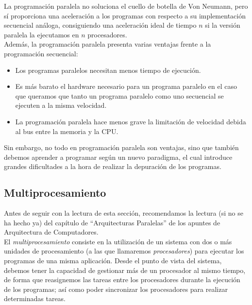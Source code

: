 La programación paralela no soluciona el cuello de botella de Von Neumann, pero sí proporciona una aceleración a los programas con respecto a su implementación secuencial análoga, consiguiendo una aceleración ideal de tiempo $n$ si la versión paralela la ejecutamos en $n$ procesadores.\\

Además, la programación paralela presenta varias ventajas frente a la programación secuencial:
\begin{itemize}
    \item Los programas paralelos necesitan menos tiempo de ejecución.
    \item Es más barato el hardware necesario para un programa paralelo en el caso que queramos que tanto un programa paralelo como uno secuencial se ejecuten a la misma velocidad.
    \item La programación paralela hace menos grave la limitación de velocidad debida al bus entre la memoria y la CPU\@.
\end{itemize}

Sin embargo, no todo en programación paralela son ventajas, sino que también debemos aprender a programar según un nuevo paradigma, el cual introduce grandes dificultades a la hora de realizar la depuración de los programas.

\subsection{Multiprocesamiento}
Antes de seguir con la lectura de esta sección, recomendamos la lectura (si no se ha hecho ya) del capítulo de ``Arquitecturas Paralelas'' de los apuntes de Arquitectura de Computadores.\\

El \textit{multiprocesamiento} consiste en la utilización de un sistema con dos o más unidades de procesamiento (a las que llamaremos \textit{procesadores}) para ejecutar los programas de una misma aplicación. Desde el punto de vista del sistema, debemos tener la capacidad de gestionar más de un procesador al mismo tiempo, de forma que reasignemos las tareas entre los procesadores durante la ejecución de los programas; así como poder sincronizar los procesadores para realizar determinadas tareas.\\

